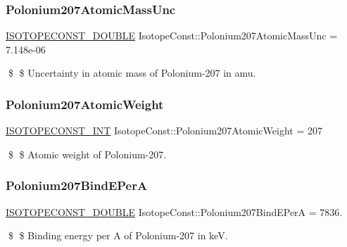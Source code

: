 \subsubsection{\texorpdfstring{Polonium207\+Atomic\+Mass\+Unc}{Polonium207AtomicMassUnc}}
{\footnotesize\ttfamily \mbox{\hyperlink{group___isotope_const-_macros_ga8f45a7272ce02c0b4c65c44636ed719a}{I\+S\+O\+T\+O\+P\+E\+C\+O\+N\+S\+T\+\_\+\+D\+O\+U\+B\+LE}} Isotope\+Const\+::\+Polonium207\+Atomic\+Mass\+Unc = 7.\+148e-\/06}

\$ \$ Uncertainty in atomic mass of Polonium-\/207 in amu. \mbox{\label{group___isotope_const-_polonium-_po207_gae773542bf06a99056120d7cf499d82ef}} 
\subsubsection{\texorpdfstring{Polonium207\+Atomic\+Weight}{Polonium207AtomicWeight}}
{\footnotesize\ttfamily \mbox{\hyperlink{group___isotope_const-_macros_ga5f18360b3e99483a35c32d789e62621c}{I\+S\+O\+T\+O\+P\+E\+C\+O\+N\+S\+T\+\_\+\+I\+NT}} Isotope\+Const\+::\+Polonium207\+Atomic\+Weight = 207}

\$ \$ Atomic weight of Polonium-\/207. \mbox{\label{group___isotope_const-_polonium-_po207_ga2cec4523b5c83f75d52ff0b54599b10b}} 
\subsubsection{\texorpdfstring{Polonium207\+Bind\+E\+PerA}{Polonium207BindEPerA}}
{\footnotesize\ttfamily \mbox{\hyperlink{group___isotope_const-_macros_ga8f45a7272ce02c0b4c65c44636ed719a}{I\+S\+O\+T\+O\+P\+E\+C\+O\+N\+S\+T\+\_\+\+D\+O\+U\+B\+LE}} Isotope\+Const\+::\+Polonium207\+Bind\+E\+PerA = 7836.}

\$ \$ Binding energy per A of Polonium-\/207 in keV. \mbox{\label{group___isotope_const-_polonium-_po207_gab86a776abba885d12548176ccf3b5780}} 
